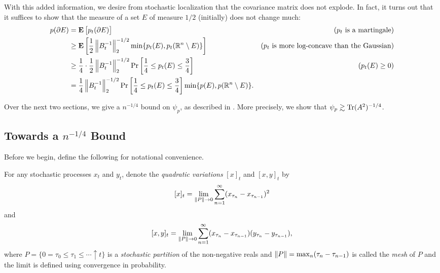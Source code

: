 \documentclass{article}
\begin{document}
		With this added information, we desire from stochastic localization that the covariance matrix does not explode. %
		In fact, it turns out that it suffices to show that the measure of a set $E$ of measure $1/2$ (initially) does not change much:
		\begin{align}
			p(\partial E) &= \textbf{E}\left[p_t(\partial E)\right] & (p_t\text{ is a martingale}) \nonumber \\
				&\geq \textbf{E}\left[\frac{1}{2}\left\lVert B_t^{-1}\right\rVert_2^{-1/2}\min\{p_t(E),p_t(\mathbb{R}^n\setminus E)\}\right] & (p_t \text{ is more log-concave than the Gaussian}) \nonumber \\
				&\geq \frac{1}{4}\cdot\frac{1}{2}\left\lVert B_t^{-1}\right\rVert_2^{-1/2}\Pr\left[\frac{1}{4} \leq p_t(E) \leq \frac{3}{4}\right] & (p_t(E) \geq 0) \nonumber \\
				&= \frac{1}{4}\left\lVert B_t^{-1}\right\rVert_2^{-1/2}\Pr\left[\frac{1}{4} \leq p_t(E) \leq \frac{3}{4}\right]\min\{p(E),p(\mathbb{R}^n\setminus E)\}. \label{stoch loc: basic intuition}
		\end{align}

		Over the next two sections, we give a $n^{-1/4}$ bound on $\psi_p$, as described in \cite{lee-vempala-kls-n14}. More precisely, we show that $\psi_p \gtrsim \operatorname{Tr}(A^2)^{-1/4}$.

	\subsection{Towards a \texorpdfstring{$n^{-1/4}$}{n1/4} Bound}

		Before we begin, define the following for notational convenience.
		\begin{definition}
			For any stochastic processes $x_t$ and $y_t$, denote the \textit{quadratic variations} $[x]_t$ and $[x,y]_t$ by
			\[ [x]_t = \lim_{\left\lVert P\right\rVert \to 0} \sum_{n=1}^\infty (x_{\tau_n} - x_{\tau_{n-1}})^2 \]
			and
			\[ [x,y]_t = \lim_{\left\lVert P\right\rVert \to 0} \sum_{n=1}^\infty (x_{\tau_n} - x_{\tau_{n-1}})(y_{\tau_n} - y_{\tau_{n-1}}), \]
			where $P = \{ 0 = \tau_0 \leq \tau_1 \leq \cdots \uparrow t \}$ is a \textit{stochastic partition} of the non-negative reals and $\left\lVert P\right\rVert = \max_n (\tau_n - \tau_{n-1})$ is called the \textit{mesh} of $P$ and the limit is defined using convergence in probability.
		\end{definition}
\end{document}
